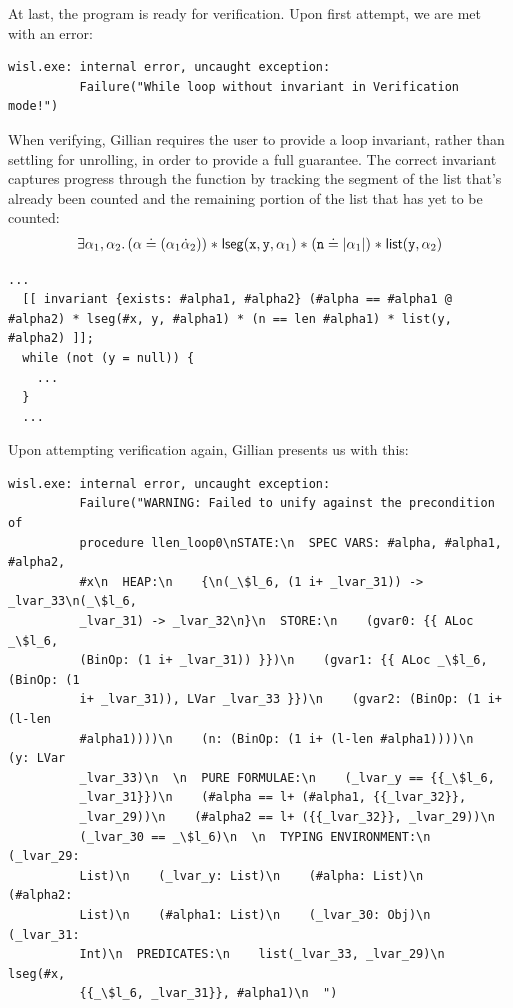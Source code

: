 At last, the program is ready for verification. Upon first attempt, we are met with an error:
\begin{lstlisting}[style=code, numbers=none, caption={Attempted verification - no loop invariant}]
wisl.exe: internal error, uncaught exception:
          Failure("While loop without invariant in Verification mode!")
\end{lstlisting}

When verifying, Gillian requires the user to provide a loop invariant, rather
than settling for unrolling, in order to provide a full guarantee. The correct
invariant captures progress through the function by tracking the segment of the
list that's already been counted and the remaining portion of the list that has
yet to be counted:
\begin{align*}
    \exists \alpha_1, \alpha_2 \ldotp (\alpha \doteq (\alpha_1 \dot \alpha_2)) \mathrel{*} \mathsf{lseg}(\mathtt{x}, \mathtt{y}, \alpha_1) \mathrel{*} (\mathtt{n} \doteq | \alpha_1 |) \mathrel{*} \mathsf{list}(\mathtt{y}, \alpha_2)
\end{align*}

\begin{lstlisting}[style=code, numbers=none, caption={WISL list length - loop invariant}]
  ...
  [[ invariant {exists: #alpha1, #alpha2} (#alpha == #alpha1 @ #alpha2) * lseg(#x, y, #alpha1) * (n == len #alpha1) * list(y, #alpha2) ]];
  while (not (y = null)) {
    ...
  }
  ...
\end{lstlisting}

Upon attempting verification again, Gillian presents us with this:
\begin{lstlisting}[style=code, numbers=none, caption={Verification: WISL list length error - precondition not met}]
wisl.exe: internal error, uncaught exception:
          Failure("WARNING: Failed to unify against the precondition of
          procedure llen_loop0\nSTATE:\n  SPEC VARS: #alpha, #alpha1, #alpha2,
          #x\n  HEAP:\n    {\n(_\$l_6, (1 i+ _lvar_31)) -> _lvar_33\n(_\$l_6,
          _lvar_31) -> _lvar_32\n}\n  STORE:\n    (gvar0: {{ ALoc _\$l_6,
          (BinOp: (1 i+ _lvar_31)) }})\n    (gvar1: {{ ALoc _\$l_6, (BinOp: (1
          i+ _lvar_31)), LVar _lvar_33 }})\n    (gvar2: (BinOp: (1 i+ (l-len
          #alpha1))))\n    (n: (BinOp: (1 i+ (l-len #alpha1))))\n    (y: LVar
          _lvar_33)\n  \n  PURE FORMULAE:\n    (_lvar_y == {{_\$l_6,
          _lvar_31}})\n    (#alpha == l+ (#alpha1, {{_lvar_32}},
          _lvar_29))\n    (#alpha2 == l+ ({{_lvar_32}}, _lvar_29))\n
          (_lvar_30 == _\$l_6)\n  \n  TYPING ENVIRONMENT:\n    (_lvar_29:
          List)\n    (_lvar_y: List)\n    (#alpha: List)\n    (#alpha2:
          List)\n    (#alpha1: List)\n    (_lvar_30: Obj)\n    (_lvar_31:
          Int)\n  PREDICATES:\n    list(_lvar_33, _lvar_29)\n    lseg(#x,
          {{_\$l_6, _lvar_31}}, #alpha1)\n  ")
\end{lstlisting}

